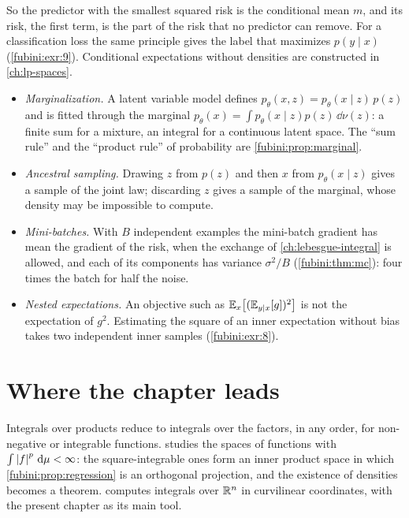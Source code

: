 \begin{notechapter}
So the predictor with the smallest squared risk is the conditional mean
$m$, and its risk, the first term, is the part of the risk that no
predictor can remove. For a classification loss the same principle
gives the label that maximizes $p(y\mid x)$ (\cref{fubini:exr:9}).
Conditional expectations without densities are constructed in
\cref{ch:lp-spaces}.

\begin{mlthread}
\begin{itemize}[nosep]
  \item \emph{Marginalization.} A latent variable model defines
        $p_\theta(x, z) = p_\theta(x\mid z)\,p(z)$ and is fitted through
        the marginal $p_\theta(x) = \int p_\theta(x\mid z)p(z)\,\dd\nu(z)$:
        a finite sum for a mixture, an integral for a continuous latent
        space. The ``sum rule'' and the ``product rule'' of probability
        are \cref{fubini:prop:marginal}.
  \item \emph{Ancestral sampling.} Drawing $z$ from $p(z)$ and then $x$
        from $p_\theta(x\mid z)$ gives a sample of the joint law;
        discarding $z$ gives a sample of the marginal, whose density may
        be impossible to compute.
  \item \emph{Mini-batches.} With $B$ independent examples the
        mini-batch gradient has mean the gradient of the risk, when the
        exchange of \cref{ch:lebesgue-integral} is allowed, and each of
        its components has variance $\sigma^2/B$
        (\cref{fubini:thm:mc}): four times the batch for half the
        noise.
  \item \emph{Nested expectations.} An objective such as
        $\mathbb{E}_x\bigl[(\mathbb{E}_{y\mid x}[g])^2\bigr]$ is not the expectation of
        $g^2$. Estimating the square of an inner expectation without
        bias takes two independent inner samples
        (\cref{fubini:exr:8}).
\end{itemize}
\end{mlthread}

\section{Where the chapter leads}\label{fubini:sec:outlook}

Integrals over products reduce to integrals over the factors, in any
order, for non-negative or integrable functions. 
studies the spaces of functions with $\int\left|f\right|^p\,\mathrm{d}\mu < \infty$:
the square-integrable ones form an inner product space in which
\cref{fubini:prop:regression} is an orthogonal projection, and the
existence of densities becomes a theorem.
 computes integrals over $\mathbb{R}^n$ in
curvilinear coordinates, with the present chapter as its main tool.


\end{notechapter}
